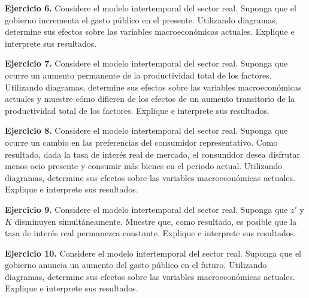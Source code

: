 \documentclass[12pt]{article}
\numberwithin{equation}{section}             %
\theoremstyle{definition}                    %
\theoremstyle{plain}                         %
\theoremstyle{remark} %
\theoremstyle{definition}
\begin{document}
\textbf{Ejercicio 6.} Considere el modelo intertemporal del sector real. Suponga que el gobierno incrementa el gasto público en el presente. Utilizando diagramas, determine sus efectos sobre las variables macroeconómicas actuales. Explique e interprete sus resultados.

\textbf{Ejercicio 7.} Considere el modelo intertemporal del sector real. Suponga que ocurre un aumento permanente de la productividad total de los factores. Utilizando diagramas, determine sus efectos sobre las variables macroeconómicas actuales y muestre cómo difieren de los efectos de un aumento transitorio de la productividad total de los factores. Explique e interprete sus resultados.

\textbf{Ejercicio 8.} Considere el modelo intertemporal del sector real.  Suponga que ocurre un cambio en las preferencias del consumidor representativo. Como resultado, dada la tasa de interés real de mercado, el consumidor desea disfrutar menos ocio presente y consumir más bienes en el periodo actual. Utilizando diagramas, determine sus efectos sobre las variables macroeconómicas actuales. Explique e interprete sus resultados.

\textbf{Ejercicio 9.} Considere el modelo intertemporal del sector real. Suponga que \(z'\) y \(K\) disminuyen simultáneamente. Muestre que, como resultado, es posible que la tasa de interés real permanezca constante. Explique e interprete sus resultados.

\textbf{Ejercicio 10.} Considere el modelo intertemporal del sector real. Suponga que el gobierno anuncia un aumento del gasto público en el futuro. Utilizando diagramas, determine sus efectos sobre las variables macroeconómicas actuales. Explique e interprete sus resultados.
\end{document}

